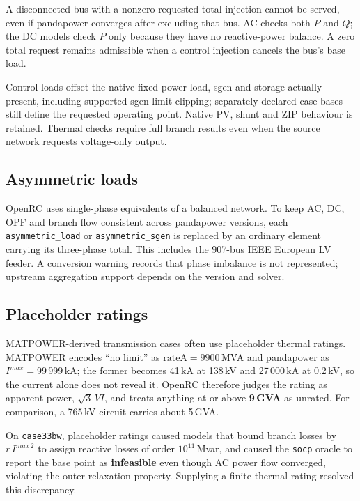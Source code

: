 \documentclass[11pt,a4paper]{report}
\newcommand{\code}[1]{\texttt{\small #1}}
\begin{document}
A disconnected bus with a nonzero requested total injection cannot be served,
even if pandapower converges after excluding that bus. AC checks both $P$ and
$Q$; the DC models check $P$ only because they have no reactive-power balance.
A zero total request remains admissible when a control injection cancels the
bus's base load.

Control loads offset the native fixed-power load, sgen and storage actually
present, including supported sgen limit clipping; separately declared case
bases still define the requested operating point. Native PV, shunt and ZIP
behaviour is retained. Thermal checks require full branch results even when
the source network requests voltage-only output.

\subsection{Asymmetric loads}

OpenRC uses single-phase equivalents of a balanced network. To keep AC, DC,
OPF and branch flow consistent across pandapower versions, each
\code{asymmetric\_load} or \code{asymmetric\_sgen} is replaced by an ordinary
element carrying its three-phase total. This includes the 907-bus IEEE
European LV feeder. A conversion warning records that phase imbalance is not
represented; upstream aggregation support depends on the version and solver.

\subsection{Placeholder ratings}
\label{sec:unrated}

MATPOWER-derived transmission cases often use placeholder thermal ratings.
MATPOWER encodes ``no limit'' as $\text{rateA} = 9900$\,MVA and pandapower
as $I^{max} = 99\,999$\,kA; the former becomes 41\,kA at 138\,kV and 27\,000\,kA
at 0.2\,kV, so the current alone does not reveal it. OpenRC therefore judges the
rating as apparent power, $\sqrt{3}\,V I$, and treats anything at or above
\textbf{9\,GVA} as unrated. For comparison, a 765\,kV circuit carries about
5\,GVA.

\begin{warnbox}
On \code{case33bw}, placeholder ratings caused models that bound branch losses
by $r \, I^{max\,2}$ to assign reactive losses of order $10^{11}$\,Mvar, and
caused the \code{socp} oracle to report the base point as \textbf{infeasible}
even though AC power flow converged, violating the outer-relaxation property.
Supplying a finite thermal rating resolved this discrepancy.
\end{warnbox}
\end{document}
